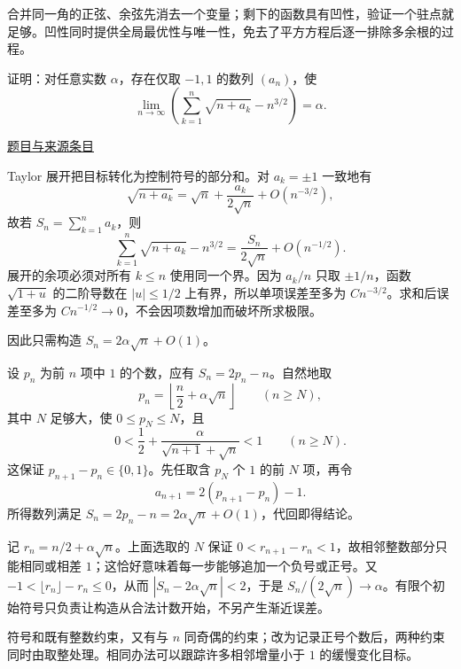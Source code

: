 \documentclass[12pt,fontset=fandol]{ctexart}
\begin{document}
\begin{remark}[方法与条件]合并同一角的正弦、余弦先消去一个变量；剩下的函数具有凹性，验证一个驻点就足够。凹性同时提供全局最优性与唯一性，免去了平方方程后逐一排除多余根的过程。\end{remark}

\begin{example}[来源序号5]\label{ex:pre03-math:5}\label{pr:pre03-math:5}

证明：对任意实数 $\alpha$，存在仅取 $-1,1$ 的数列 $(a_n)$，使
\[
\lim_{n\to\infty}
\left(\sum_{k=1}^n\sqrt{n+a_k}-n^{3/2}\right)=\alpha.
\]

\par\href{https://github.com/lzxcr/cmc-mathematics/blob/64916fa1fdbc3e444a652eca204d5669058ee321/src/problems/preliminary/03/05.md}{题目与来源条目}

\end{example}

\begin{solve}\label{ans:pre03-math:5}

Taylor 展开把目标转化为控制符号的部分和。对 $a_k=\pm1$ 一致地有
\[
\sqrt{n+a_k}=\sqrt n+\frac{a_k}{2\sqrt n}+O(n^{-3/2}),
\]
故若 $S_n=\sum_{k=1}^na_k$，则
\[
\sum_{k=1}^n\sqrt{n+a_k}-n^{3/2}
=\frac{S_n}{2\sqrt n}+O(n^{-1/2}).
\]
展开的余项必须对所有 $k\le n$ 使用同一个界。因为 $a_k/n$ 只取 $\pm1/n$，函数 $\sqrt{1+u}$ 的二阶导数在 $|u|\le1/2$ 上有界，所以单项误差至多为 $Cn^{-3/2}$。求和后误差至多为 $Cn^{-1/2}\to0$，不会因项数增加而破坏所求极限。

因此只需构造 $S_n=2\alpha\sqrt n+O(1)$。

设 $p_n$ 为前 $n$ 项中 $1$ 的个数，应有 $S_n=2p_n-n$。自然地取
\[
p_n=\left\lfloor\frac n2+\alpha\sqrt n\right\rfloor
\qquad(n\ge N),
\]
其中 $N$ 足够大，使 $0\le p_N\le N$，且
\[
0<\frac12+\frac{\alpha}{\sqrt{n+1}+\sqrt n}<1
\qquad(n\ge N).
\]
这保证 $p_{n+1}-p_n\in\{0,1\}$。先任取含 $p_N$ 个 $1$ 的前 $N$ 项，再令
\[
a_{n+1}=2(p_{n+1}-p_n)-1.
\]
所得数列满足 $S_n=2p_n-n=2\alpha\sqrt n+O(1)$，代回即得结论。

记 $r_n=n/2+\alpha\sqrt n$。上面选取的 $N$ 保证 $0<r_{n+1}-r_n<1$，故相邻整数部分只能相同或相差 $1$；这恰好意味着每一步能够追加一个负号或正号。又 $-1<\lfloor r_n\rfloor-r_n\le0$，从而 $|S_n-2\alpha\sqrt n|<2$，于是 $S_n/(2\sqrt n)\to\alpha$。有限个初始符号只负责让构造从合法计数开始，不另产生渐近误差。

\end{solve}

\begin{remark}[方法与条件]符号和既有整数约束，又有与 $n$ 同奇偶的约束；改为记录正号个数后，两种约束同时由取整处理。相同办法可以跟踪许多相邻增量小于 $1$ 的缓慢变化目标。\end{remark}
\end{document}
